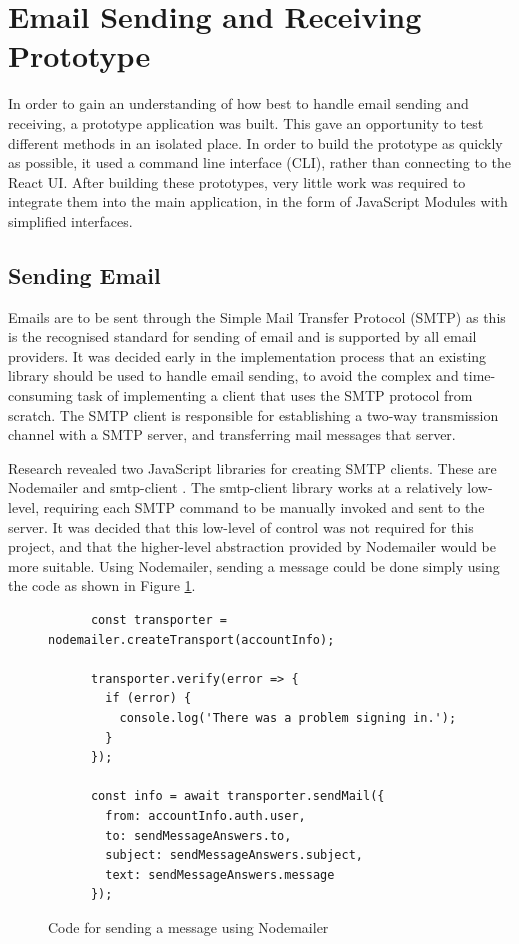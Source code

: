 \section{Email Sending and Receiving Prototype}
In order to gain an understanding of how best to handle email sending and receiving, a prototype application was built. This gave an opportunity to test different methods in an isolated place. In order to build the prototype as quickly as possible, it used a command line interface (CLI), rather than connecting to the React UI. After building these prototypes, very little work was required to integrate them into the main application, in the form of JavaScript Modules with simplified interfaces.

\subsection{Sending Email}
Emails are to be sent through the Simple Mail Transfer Protocol (SMTP) \cite{smtp-rfc} as this is the recognised standard for sending of email and is supported by all email providers. It was decided early in the implementation process that an existing library should be used to handle email sending, to avoid the complex and time-consuming task of implementing a client that uses the SMTP protocol from scratch. The SMTP client is responsible for establishing a two-way transmission channel with a SMTP server, and transferring mail messages that server.

Research revealed two JavaScript libraries for creating SMTP clients. These are Nodemailer \cite{nodemailer} and smtp-client \cite{smtp-client}. The smtp-client library works at a relatively low-level, requiring each SMTP command to be manually invoked and sent to the server. It was decided that this low-level of control was not required for this project, and that the higher-level abstraction provided by Nodemailer would be more suitable. Using Nodemailer, sending a message could be done simply using the code as shown in Figure \ref{fig:smtp-code}.

\begin{figure}[h!]
  \centering
    \begin{verbatim}
      const transporter = nodemailer.createTransport(accountInfo);

      transporter.verify(error => {
        if (error) {
          console.log('There was a problem signing in.');
        }
      });

      const info = await transporter.sendMail({
        from: accountInfo.auth.user,
        to: sendMessageAnswers.to,
        subject: sendMessageAnswers.subject,
        text: sendMessageAnswers.message
      });
    \end{verbatim}
  \caption{Code for sending a message using Nodemailer}
  \label{fig:smtp-code}
\end{figure}

